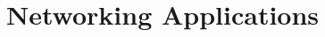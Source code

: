 \newpage
\section{Networking Applications}
\label{Networking Applications}
\begin{NexMainBox}
	\begin{NexMainBox}
	\end{NexMainBox}
	\begin{NexMainBox}
	\end{NexMainBox}
\end{NexMainBox}

